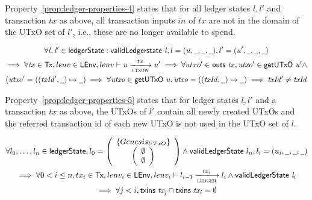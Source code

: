 Property~\ref{prop:ledger-properties-4} states that for all ledger states
$l, l'$ and transaction $tx$ as above, all transaction inputs $in$ of $tx$ are
not in the domain of the UTxO set of $l'$, i.e., these are no longer available
to spend.

\begin{property}
  \begin{multline*}
    \forall \var{l}, \var{l'} \in \ledgerState: \applyFun{validLedgerstate}{l},
    l=(u,\wcard,\wcard,\wcard), l' = (u',\wcard,\wcard,\wcard)\\
    \implies \forall \var{tx} \in \Tx, lenv \in\LEnv, lenv \vdash \var{u}
    \trans{utxow}{tx} \var{u'} \implies \forall utxo' \in \applyFun{outs}{tx},
    \var{utxo'} \in \applyFun{getUTxO}{u'} \wedge \\(\var{utxo'} =
    ((\var{txId'}, \wcard) \mapsto \wcard) \implies \forall \var{utxo} \in
    \applyFun{getUTxO}{u}, \var{utxo} = ((\var{txId}, \wcard) \mapsto \wcard)
    \implies \var{txId'} \neq \var{txId}
  \end{multline*}
  \label{prop:ledger-properties-5}
\end{property}

Property~\ref{prop:ledger-properties-5} states that for ledger states $l, l'$
and a transaction $tx$ as above, the UTxOs of $l'$ contain all newly created
UTxOs and the referred transaction id of each new UTxO is not used in the UTxO
set of $l$.

\begin{property}
  \begin{multline*}
    \forall l_{0},\ldots,l_{n} \in \ledgerState, l_{0} =
    \left(
      \begin{array}{c}
        \left\{
        \genesisUTxO
        \right\} \\
        \left(
        \begin{array}{c}
          \emptyset\\
          \emptyset
        \end{array}
        \right)
      \end{array}
    \right) \wedge \applyFun{validLedgerState} l_{n}, l_{i}=(u_{i},\wcard,\wcard,\wcard)\\
    \implies \forall 0 < i \leq n, tx_{i} \in \Tx, lenv_{i}\in\LEnv,
    lenv_{i} \vdash l_{i-1}
    \trans{ledger}{tx_{i}} l_{i} \wedge \applyFun{validLedgerState} l_{i} \\
    \implies \forall j < i, \applyFun{txins}{tx_{j}} \cap
    \applyFun{txins}{tx_{i}} = \emptyset
  \end{multline*}
  \label{prop:ledger-properties-no-double-spend}
\end{property}

